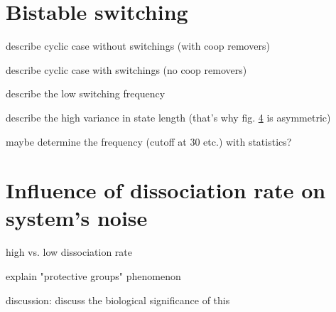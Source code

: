     \section{Bistable switching}
        \label{sec:ResBistableSwitching}
        \begin{figure}[htpb!]
            \centering
            \caption{}
            \label{img:cyclBistability_runPlot1}
        \end{figure}
        \begin{figure}[htpb!]
            \centering
            \caption{}
            \label{img:cyclBistability_runPlot2}
        \end{figure}
        \begin{itemize}
            {
                \color{red}
                \item describe cyclic case without switchings (with coop removers)
                \item describe cyclic case with switchings (no coop removers)
                \item describe the low switching frequency
                \item describe the high variance in state length (that's why fig. \ref{img:cyclBistability_runPlot2} is asymmetric)
                \item maybe determine the frequency (cutoff at 30 etc.) with statistics?
            }
        \end{itemize}
    \newpage
    \section{Influence of dissociation rate on system's noise}
        \label{sec:ResInfluenceDissociationRate}
        \begin{figure}[htpb!]
            \centering
            \caption{}
            \label{img:cyclBistability_runPlot2}
        \end{figure}
        \begin{figure}[htpb!]
            \centering
            \caption{}
            \label{img:cyclBistability_runPlot2}
        \end{figure}
        \begin{itemize}
            {
                \color{red}
                \item high vs. low dissociation rate
                \item explain "protective groups" phenomenon
                \item discussion: discuss the biological significance of this
            }
        \end{itemize}
    \newpage
